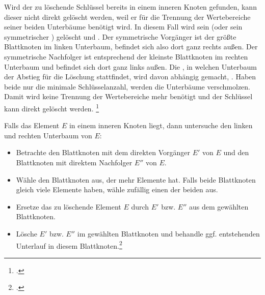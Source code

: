 \documentclass{lehramt-informatik-haupt}
\begin{document}
Wird der zu löschende Schlüssel bereits in einem inneren Knoten
gefunden, kann dieser nicht direkt gelöscht werden, weil er für die
Trennung der Wertebereiche seiner beiden Unterbäume benötigt wird. In
diesem Fall wird sein  (oder sein
symmetrischer ) gelöscht und . Der symmetrische Vorgänger ist der größte Blattknoten im
linken Unterbaum, befindet sich also dort ganz rechts außen. Der
symmetrische Nachfolger ist entsprechend der kleinste Blattknoten im
rechten Unterbaum und befindet sich dort ganz links außen. Die
, in welchen Unterbaum der Abstieg für die Löschung
stattfindet, wird davon abhängig gemacht, . Haben beide nur die minimale Schlüsselanzahl, werden
die Unterbäume verschmolzen. Damit wird keine Trennung der Wertebereiche
mehr benötigt und der Schlüssel kann direkt gelöscht werden.
\footcite{wiki:bbaum}

Falls das Element $E$ in einem inneren Knoten liegt, dann
untersuche den linken und rechten Unterbaum von $E$:

\begin{itemize}
\item Betrachte den Blattknoten mit dem direkten Vorgänger $E'$ von $E$
und den Blattknoten mit direktem Nachfolger $E''$ von $E$.

\item Wähle den Blattknoten aus, der mehr Elemente hat. Falls beide
Blattknoten gleich viele Elemente haben, wähle zufällig einen der beiden
aus.

\item Ersetze das zu löschende Element $E$ durch $E'$ bzw. $E''$ aus dem
gewählten Blattknoten.

\item Lösche $E'$ bzw. $E''$ im gewählten Blattknoten und behandle ggf.
entstehenden Unterlauf in diesem Blattknoten.\footcite[Seite
39]{aud:fs:5}
\end{itemize}


\literatur
\end{document}

